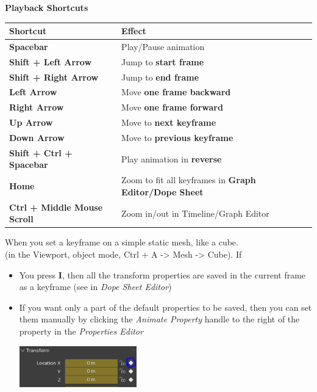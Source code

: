 \documentclass{article}
\begin{document}
\textbf{Playback Shortcuts}
\begin{longtable}{ll}
    \toprule
    \textbf{Shortcut}                   & \textbf{Effect}                                               \\
    \midrule
    \endhead
    \bottomrule
    \endfoot

    \textbf{Spacebar}                   & Play/Pause animation                                          \\
    \textbf{Shift + Left Arrow}         & Jump to \textbf{start frame}                                  \\
    \textbf{Shift + Right Arrow}        & Jump to \textbf{end frame}                                    \\
    \textbf{Left Arrow}                 & Move \textbf{one frame backward}                              \\
    \textbf{Right Arrow}                & Move \textbf{one frame forward}                               \\
    \textbf{Up Arrow}                   & Move to \textbf{next keyframe}                                \\
    \textbf{Down Arrow}                 & Move to \textbf{previous keyframe}                            \\
    \textbf{Shift + Ctrl + Spacebar}    & Play animation in \textbf{reverse}                            \\
    \textbf{Home}                       & Zoom to fit all keyframes in \textbf{Graph Editor/Dope Sheet} \\
    \textbf{Ctrl + Middle Mouse Scroll} & Zoom in/out in Timeline/Graph Editor                          \\
\end{longtable}
When you set a keyframe on a simple static mesh, like a cube. \\ (in the Viewport, object mode, Ctrl + A -> Mesh -> Cube). If
\begin{itemize}[topsep=0pt, noitemsep]
    \item You press \textbf{I}, then all the transform properties are saved in the current frame as a keyframe (see in \textit{Dope Sheet Editor})
    \item If you want only a part of the default properties to be saved, then you can set them manually by clicking the \textit{Animate Property} handle to
          the right of the property in the \textit{Properties Editor}
          \begin{center}
              \includegraphics[width=0.4\textwidth]{blender_docs_images/my_properties_animate_handle.png}
          \end{center}
\end{itemize}
\end{document}

